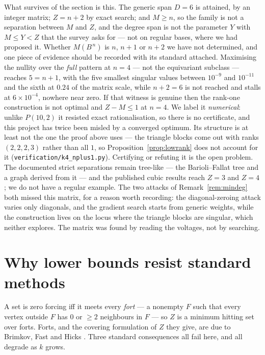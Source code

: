 \documentclass[11pt]{article}
\theoremstyle{definition}
\begin{document}
\noindent
What survives of the section is this. The generic span $D=6$ is attained, by an
integer matrix; $Z=n+2$ by exact search; and $M\ge n$, so the family is not a
separation between $M$ and $Z$, and the degree span is not the parameter $Y$
with $M\le Y<Z$ that the survey \cite{FH} asks for --- not on regular bases,
where we had proposed it. Whether $M(B^{\,n})$ is $n$, $n+1$ or $n+2$ we have
not determined, and one piece of evidence should be recorded with its standard
attached. Maximising the nullity over the \emph{full} pattern at $n=4$ --- not
the equivariant subclass --- reaches $5=n+1$, with the five smallest singular
values between $10^{-9}$ and $10^{-11}$ and the sixth at $0.24$ of the matrix
scale, while $n+2=6$ is not reached and stalls at $6\times10^{-4}$, nowhere
near zero. If that witness is genuine then the rank-one construction is not
optimal and $Z-M\le1$ at $n=4$. We label it \emph{numerical}: unlike
$P(10,2)$ it resisted exact rationalisation, so there is no certificate, and
this project has twice been misled by a converged optimum. Its structure is at
least not the one the proof above uses --- the triangle blocks come out with
ranks $(2,2,2,3)$ rather than all $1$, so Proposition~\ref{prop:lowrank} does
not account for it (\texttt{verification/k4\_nplus1.py}). Certifying or
refuting it is the open problem.
The documented strict separations remain tree-like --- the
Barioli--Fallat tree and a graph derived from it --- and the published cubic
results reach $Z=3$ and $Z=4$ \cite{AVG}; we do not have a regular example. The
two attacks of Remark~\ref{rem:mindeg} both missed this matrix, for a reason
worth recording: the diagonal-zeroing attack varies only diagonals, and the
gradient search starts from generic weights, while the construction lives on
the locus where the triangle blocks are singular, which neither explores. The
matrix was found by reading the voltages, not by searching.

\section{Why lower bounds resist standard methods}\label{sec:resist}
A set is zero forcing iff it meets every \emph{fort} --- a nonempty $F$ such
that every vertex outside $F$ has $0$ or $\ge2$ neighbours in $F$ --- so $Z$
is a minimum hitting set over forts. Forts, and the covering formulation of $Z$
they give, are due to Brimkov, Fast and Hicks \cite{BFH}. Three standard consequences all fail
here, and all degrade as $k$ grows.
\end{document}
